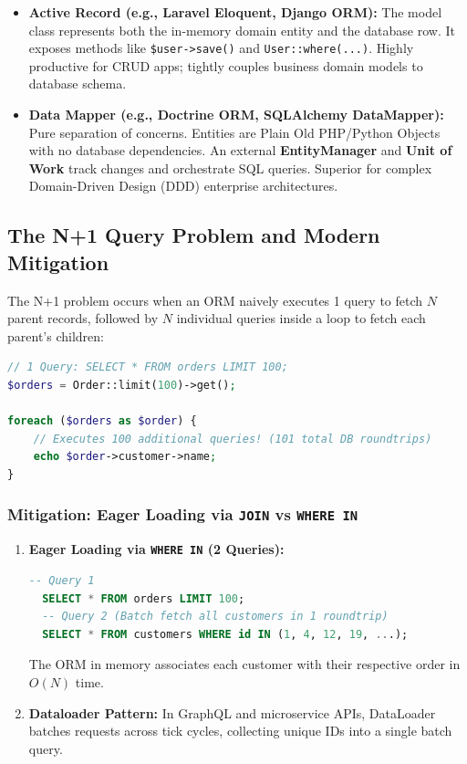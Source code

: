 \begin{itemize}[leftmargin=15pt]
  \item \textbf{Active Record (e.g., Laravel Eloquent, Django ORM):} The model class represents both the in-memory domain entity and the database row. It exposes methods like \texttt{\$user->save()} and \texttt{User::where(...)}. Highly productive for CRUD apps; tightly couples business domain models to database schema.
  \item \textbf{Data Mapper (e.g., Doctrine ORM, SQLAlchemy DataMapper):} Pure separation of concerns. Entities are Plain Old PHP/Python Objects with no database dependencies. An external \textbf{EntityManager} and \textbf{Unit of Work} track changes and orchestrate SQL queries. Superior for complex Domain-Driven Design (DDD) enterprise architectures.
\end{itemize}

\subsection{The N+1 Query Problem and Modern Mitigation}

The N+1 problem occurs when an ORM naively executes 1 query to fetch $N$ parent records, followed by $N$ individual queries inside a loop to fetch each parent's children:

\begin{lstlisting}[language=PHP,caption={The Fatal N+1 Anti-Pattern}]
// 1 Query: SELECT * FROM orders LIMIT 100;
$orders = Order::limit(100)->get();

foreach ($orders as $order) {
    // Executes 100 additional queries! (101 total DB roundtrips)
    echo $order->customer->name; 
}
\end{lstlisting}

\subsubsection{Mitigation: Eager Loading via \texttt{JOIN} vs \texttt{WHERE IN}}
\begin{enumerate}[leftmargin=15pt]
  \item \textbf{Eager Loading via \texttt{WHERE IN} (2 Queries):}
  \begin{lstlisting}[language=SQL]
  -- Query 1
  SELECT * FROM orders LIMIT 100;
  -- Query 2 (Batch fetch all customers in 1 roundtrip)
  SELECT * FROM customers WHERE id IN (1, 4, 12, 19, ...);
  \end{lstlisting}
  The ORM in memory associates each customer with their respective order in $O(N)$ time.
  \item \textbf{Dataloader Pattern:} In GraphQL and microservice APIs, DataLoader batches requests across tick cycles, collecting unique IDs into a single batch query.
\end{enumerate}

